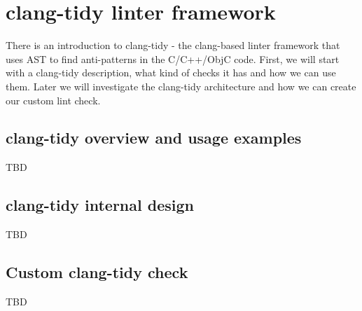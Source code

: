 \chapter{clang-tidy linter framework}
There is an introduction to clang-tidy - the clang-based linter framework that
uses AST to find anti-patterns in the C/C++/ObjC code. First, we will start with
a clang-tidy description, what kind of checks it has and how we can use
them. Later we will investigate the clang-tidy architecture and how we can
create our custom lint check. 

\section{clang-tidy overview and usage examples}
TBD

\section{clang-tidy internal design}

TBD

\section{Custom clang-tidy check}

TBD

